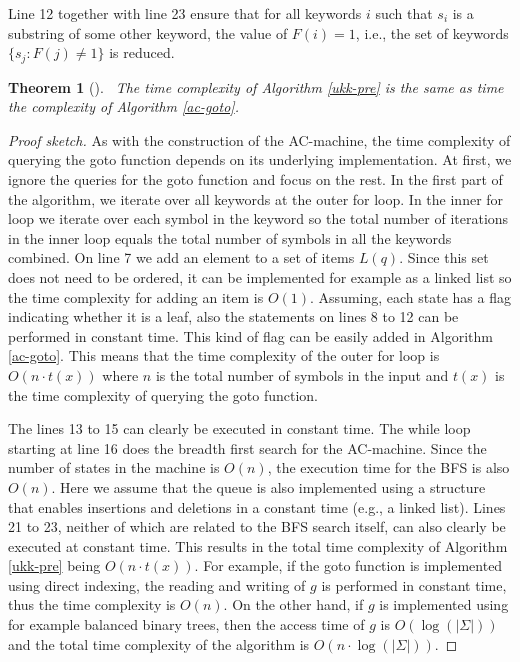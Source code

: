 \documentclass[english,twoside,censored,csm,algorithms-track-2020]{HYthesisML}
\theoremstyle{plain}
\newtheorem{theorem}{Theorem}[chapter]
\theoremstyle{definition}
\begin{document}
Line 12 together with line 23 ensure that for all keywords $i$ such that $s_i$ is a substring
of some other keyword, the value of $F(i)=1$, i.e., the set of keywords $\{s_j : F(j) \neq 1\}$ is
reduced.

\begin{theorem}[]~\label{thm-time-pre}
  The time complexity of Algorithm \ref{ukk-pre} is the same as time the complexity of
  Algorithm \ref{ac-goto}.
\end{theorem}
\begin{proof}[Proof sketch]
As with the construction of
the AC-machine, the time complexity of querying the goto function depends on its underlying
implementation. At first, we ignore the queries for the goto function and focus on the rest.
In the first part of the algorithm, we iterate over all keywords at the outer for loop. In the
inner for loop we iterate over each symbol in the keyword so the total number of iterations
in the inner loop equals the total number of symbols in all the keywords combined. On line 7
we add an element to a set of items $L(q)$. Since this set does not need to be ordered, it can be
implemented for example as a linked list so the time complexity for adding an item is $O(1)$.
Assuming, each state has a flag indicating whether it is a leaf, also the statements on
lines 8 to 12 can be performed in constant time. This kind of flag can be easily
added in Algorithm \ref{ac-goto}.
This means that
the time complexity of the outer for loop is $O(n\cdot t(x))$ where $n$ is the total number of
symbols in the input and $t(x)$ is the time complexity of querying the goto function.

The lines 13 to 15 can clearly be executed in constant time. The while loop starting at line 16
does the breadth first search for the AC-machine. Since the number of states in the machine is
$O(n)$, the execution time for the BFS is also $O(n)$. Here we assume that the queue is also
implemented using a structure that enables insertions and deletions in a constant time (e.g.,
a linked list). Lines 21 to 23, neither of which are related to the BFS search itself, can also clearly
be executed at constant time. This results in the total time complexity of Algorithm \ref{ukk-pre} being
$O(n\cdot t(x))$. For example, if the goto function is implemented using direct indexing, the
reading and writing of $g$ is performed in constant time, thus the time complexity is $O(n)$.
On the other hand, if $g$ is implemented using for example balanced binary trees, then the access
time of $g$ is $O(\log (|\Sigma|))$ and the total time complexity of the algorithm
is $O(n\cdot\log(|\Sigma|))$.

\end{proof}
\end{document}
